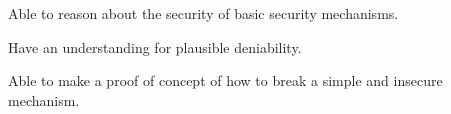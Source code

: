 \item Able to reason about the security of basic security mechanisms.
\item Have an understanding for plausible deniability.
\item Able to make a proof of concept of how to break a simple and insecure 
mechanism.
